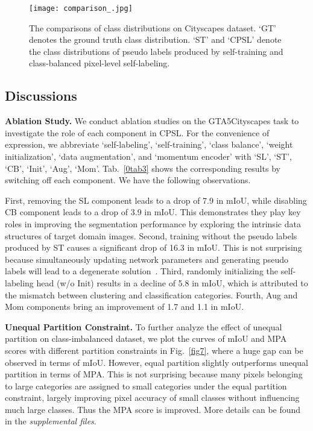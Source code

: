 \documentclass[10pt,twocolumn,letterpaper]{article}
\begin{document}
	\begin{figure}
		\vspace{-0.5em}
		\centering
		\texttt{[image: comparison\_.jpg]}\\
		\vspace{-1.0em}
		\caption{The comparisons of class distributions on Cityscapes dataset. `GT' denotes the ground truth class distribution. `ST' and `CPSL' denote the class distributions of pseudo labels produced by self-training and class-balanced pixel-level self-labeling.}
		\label{fig5}
		\vspace{-1em}
	\end{figure}
	
	\subsection{Discussions}
	\label{sec4.3}
	\noindent\textbf{Ablation Study.} We conduct ablation studies on the GTA5Cityscapes task to investigate the role of each component in CPSL. For the convenience of expression, we abbreviate `self-labeling', `self-training', `class balance', `weight initialization', `data augmentation', and `momentum encoder' with `SL', `ST', `CB', `Init', `Aug', `Mom'. Tab.~\ref{0tab3} shows the corresponding results by switching off each component. We have the following observations.
	
	First, removing the SL component leads to a drop of 7.9 in mIoU, while disabling CB component leads to a drop of 3.9 in mIoU. This demonstrates they play key roles in improving the segmentation performance by exploring the intrinsic data structures of target domain images. Second, training without the pseudo labels produced by ST causes a significant drop of 16.3 in mIoU. This is not surprising because simultaneously updating network parameters and generating pseudo labels will lead to a degenerate solution~\cite{zhang2021prototypical,zhang2019category}. Third, randomly initializing the self-labeling head (w/o Init) results in a decline of 5.8 in mIoU, which is attributed to the mismatch between clustering and classification categories. Fourth, Aug and Mom components bring an improvement of 1.7 and 1.1 in mIoU. 
	
	\vspace{0.1em}	\noindent\textbf{Unequal Partition Constraint.} To further analyze the effect of unequal partition on class-imbalanced dataset, we plot the curves of mIoU and MPA scores with different partition constraints in Fig.~\ref{fig7}, where a huge gap can be observed in terms of mIoU. However, equal partition slightly outperforms unequal partition in terms of MPA. This is not surprising because many pixels belonging to large categories are assigned to small categories under the equal partition constraint, largely improving pixel accuracy of small classes without influencing much large classes. Thus the MPA score is improved. More details can be found in the \textit{supplemental files}.
	
\end{document}
